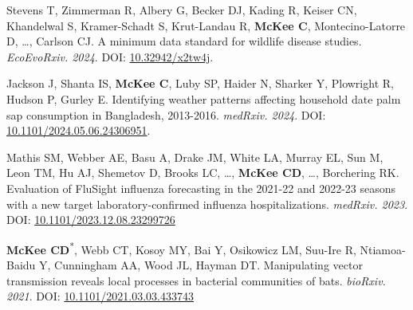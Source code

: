 \documentclass{cv}
\begin{document}
\begin{pubenum}

\item Stevens T, Zimmerman R, Albery G, Becker DJ, Kading R, Keiser CN, Khandelwal S, Kramer-Schadt S, Krut-Landau R, \textbf{McKee C}, Montecino-Latorre D, …, Carlson CJ. A minimum data standard for wildlife disease studies. \textit{EcoEvoRxiv. 2024}. DOI: \href{https://doi.org/10.32942/x2tw4j}{10.32942/x2tw4j}.

\item Jackson J\textsuperscript{\ddag}, Shanta IS, \textbf{McKee C}, Luby SP, Haider N, Sharker Y, Plowright R, Hudson P, Gurley E. Identifying weather patterns affecting household date palm sap consumption in Bangladesh, 2013-2016. \textit{medRxiv. 2024}. DOI: \href{https://doi.org/10.1101/2024.05.06.24306951}{10.1101/2024.05.06.24306951}.

\item Mathis SM, Webber AE, Basu A, Drake JM, White LA, Murray EL, Sun M, Leon TM, Hu AJ, Shemetov D, Brooks LC, …, \textbf{McKee CD}, …, Borchering RK. Evaluation of FluSight influenza forecasting in the 2021-22 and 2022-23 seasons with a new target laboratory-confirmed influenza hospitalizations. \textit{medRxiv. 2023}. DOI: \href{https://doi.org/10.1101/2023.12.08.23299726}{10.1101/2023.12.08.23299726}

\item \textbf{McKee CD}\textsuperscript{*}, Webb CT, Kosoy MY, Bai Y, Osikowicz LM, Suu-Ire R, Ntiamoa-Baidu Y, Cunningham AA, Wood JL, Hayman DT. Manipulating vector transmission reveals local processes in bacterial communities of bats. \textit{bioRxiv. 2021}. DOI: \href{https://doi.org/10.1101/2021.03.03.433743}{10.1101/2021.03.03.433743}

 \end{pubenum}



\end{document}
